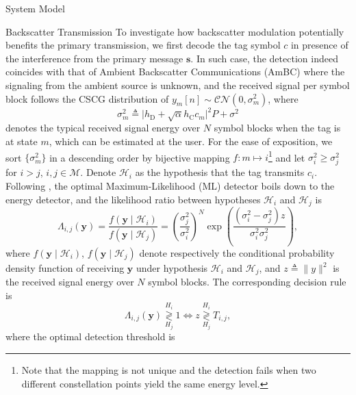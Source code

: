 \documentclass[journal]{IEEEtran}
\begin{document}
\begin{section}{System Model}
		\begin{subsection}{Backscatter Transmission}
			To investigate how backscatter modulation potentially benefits the primary transmission, we first decode the tag symbol $c$ in presence of the interference from the primary message $\boldsymbol{s}$. In such case, the detection indeed coincides with that of Ambient Backscatter Communications (AmBC) where the signaling from the ambient source is unknown, and the received signal per symbol block follows the CSCG distribution of $y_m[n] \sim \mathcal{CN}(0,\sigma_m^2)$, where
			\begin{equation}
				\sigma_m^2 \triangleq \lvert h_{\mathrm{D}} + \sqrt{\alpha} h_{\mathrm{C}} c_m \rvert^2 P + \sigma^2
				\label{eq:typical_energy}
			\end{equation}
			denotes the typical received signal energy over $N$ symbol blocks when the tag is at state $m$, which can be estimated at the user. For the ease of exposition, we sort $\{\sigma_m^2\}$ in a descending order by bijective mapping $f \colon m \mapsto i$\footnote{Note that the mapping is not unique and the detection fails when two different constellation points yield the same energy level.} and let $\sigma_i^2 \ge \sigma_j^2$ for $i > j$, $i,j \in \mathcal{M}$. Denote $\mathcal{H}_i$ as the hypothesis that the tag transmits $c_i$. Following \cite{Qian2019}, the optimal Maximum-Likelihood (ML) detector boils down to the energy detector, and the likelihood ratio between hypotheses $\mathcal{H}_i$ and $\mathcal{H}_j$ is
			\begin{equation}
				\Lambda_{i, j}(\boldsymbol{y}) = \frac{f(\boldsymbol{y} \mid \mathcal{H}_i)}{f(\boldsymbol{y} \mid \mathcal{H}_j)} = \left( \frac{\sigma_j^2}{\sigma_i^2} \right)^N \exp \left( \frac{(\sigma_i^2 - \sigma_j^2) z}{\sigma_i^2 \sigma_j^2} \right),
			\end{equation}
			where $f(\boldsymbol{y} \mid \mathcal{H}_i)$, $f(\boldsymbol{y} \mid \mathcal{H}_j)$ denote respectively the conditional probability density function of receiving $\boldsymbol{y}$ under hypothesis $\mathcal{H}_i$ and $\mathcal{H}_j$, and $z \triangleq \lVert y \rVert^2$ is the received signal energy over $N$ symbol blocks. The corresponding decision rule is
			\begin{equation}
				\Lambda_{i, j}(\boldsymbol{y}) \underset{H_j}{\overset{H_i}{\gtrless}} 1 \iff z \underset{H_j}{\overset{H_i}{\gtrless}} T_{i, j},
			\end{equation}
			where the optimal detection threshold is
			\begin{equation}

\end{equation}
\end{subsection}
\end{section}
\end{document}
